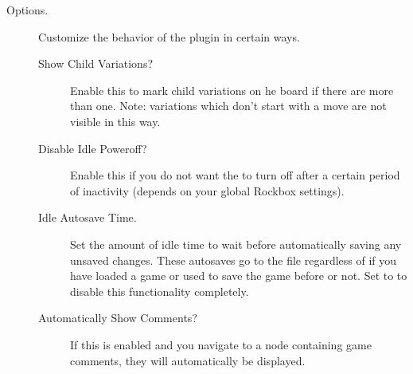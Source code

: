 \begin {description}
\item [Options. ]
    Customize the behavior of the plugin in certain ways.
    \begin{description}
        \item[Show Child Variations?] Enable this to mark child variations on
            he board if there are more than one.  Note: variations which don't
            start with a move are not visible in this way.
        \item[Disable Idle Poweroff?] Enable this if you do not want the \dap{}
            to turn off after a certain period of inactivity (depends on your
            global Rockbox settings).
        \item[Idle Autosave Time.] Set the amount of idle time to wait before
            automatically saving any unsaved changes.  These autosaves go to
            the file  regardless of if you have
            loaded a game or used  to save the game before or
            not.  Set to  to disable this functionality completely.
        \item[Automatically Show Comments?] If this is enabled and you navigate
            to a node containing game comments, they will automatically be
            displayed.
    \end{description}


\end{description}
